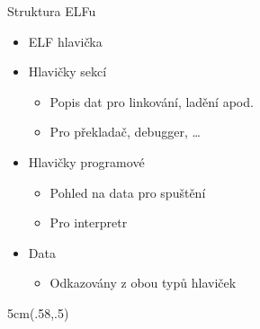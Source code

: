 
\begin{frame}{Struktura ELFu}

  \begin{itemize}
    \item ELF hlavička

    \pause

    \item Hlavičky sekcí
    \begin{itemize}
      \item Popis dat pro linkování, ladění apod.
      \item Pro překladač, debugger, \dots
    \end{itemize}

    \item Hlavičky programové
    \begin{itemize}
      \item Pohled na data pro spuštění
      \item Pro interpretr
    \end{itemize}

    \pause

    \item Data
    \begin{itemize}
      \item Odkazovány z obou typů hlaviček
    \end{itemize}
  \end{itemize}

  \begin{textblock*}{5cm}(.58\textwidth,.5\textheight-2.3cm)
    
  \end{textblock*}

\end{frame}

